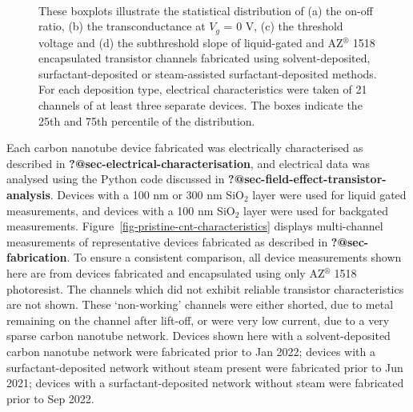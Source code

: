 \documentclass[
  letterpaper,
  DIV=11,
  numbers=noendperiod]{scrartcl}
\begin{document}
\begin{figure}
\begin{minipage}[t]{0.01\linewidth}
{~

}

\end{minipage}%

\caption{\label{fig-sweep-parameters}These boxplots illustrate the
statistical distribution of (a) the on-off ratio, (b) the
transconductance at \(V_g\) = 0 V, (c) the threshold voltage and (d) the
subthreshold slope of liquid-gated and AZ\(^\circledR\) 1518
encapsulated transistor channels fabricated using solvent-deposited,
surfactant-deposited or steam-assisted surfactant-deposited methods. For
each deposition type, electrical characteristics were taken of 21
channels of at least three separate devices. The boxes indicate the 25th
and 75th percentile of the distribution.}

\end{figure}

Each carbon nanotube device fabricated was electrically characterised as
described in \textbf{?@sec-electrical-characterisation}, and electrical
data was analysed using the Python code discussed in
\textbf{?@sec-field-effect-transistor-analysis}. Devices with a 100 nm
or 300 nm SiO\(_2\) layer were used for liquid gated measurements, and
devices with a 100 nm SiO\(_2\) layer were used for backgated
measurements. Figure~\ref{fig-pristine-cnt-characteristics} displays
multi-channel measurements of representative devices fabricated as
described in \textbf{?@sec-fabrication}. To ensure a consistent
comparison, all device measurements shown here are from devices
fabricated and encapsulated using only AZ\(^\circledR\) 1518
photoresist. The channels which did not exhibit reliable transistor
characteristics are not shown. These `non-working' channels were either
shorted, due to metal remaining on the channel after lift-off, or were
very low current, due to a very sparse carbon nanotube network. Devices
shown here with a solvent-deposited carbon nanotube network were
fabricated prior to Jan 2022; devices with a surfactant-deposited
network without steam present were fabricated prior to Jun 2021; devices
with a surfactant-deposited network without steam were fabricated prior
to Sep 2022.
\end{document}
